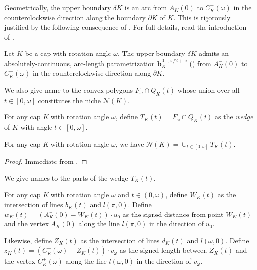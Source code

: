 Geometrically, the upper boundary \(\delta K\) is an arc from \(A_K^-(0)\) to \(C_K^+(\omega)\) in the counterclockwise direction along the boundary \(\partial K\) of \(K\). This is rigorously justified by the following consequence of . For full details, read the introduction of .

\begin{corollary}

Let \(K\) be a cap with rotation angle \(\omega\). The upper boundary \(\delta K\) admits an absolutely-continuous, arc-length parametrization \(\mathbf{b}_K^{0-, \pi/2 + \omega}\) () from \(A_K^-(0)\) to \(C_K^+(\omega)\) in the counterclockwise direction along \(\partial K\).

\label{cor:upper-boundary-param}
\end{corollary}

We also give name to the convex polygons \(F_\omega \cap Q^-_K(t)\) whose union over all \(t \in [0, \omega]\) constitutes the niche \(\mathcal{N}(K)\).

\begin{definition}

For any cap \(K\) with rotation angle \(\omega\), define \(T_K(t) = F_\omega \cap Q^-_K(t)\) as the \emph{wedge} of \(K\) with angle \(t \in [0, \omega]\).

\label{def:wedge}
\end{definition}

\begin{proposition}

For any cap \(K\) with rotation angle \(\omega\), we have \(\mathcal{N}(K) = \cup_{t \in [0, \omega]} T_K(t)\).

\label{pro:wedge}
\end{proposition}

\begin{proof}
Immediate from .
\end{proof}

We give names to the parts of the wedge \(T_K(t)\).

\begin{definition}

For any cap \(K\) with rotation angle \(\omega\) and \(t \in (0, \omega)\), define \(W_K(t)\) as the intersection of lines \(b_K(t)\) and \(l(\pi, 0)\). Define \(w_K(t) = (A_K^-(0) - W_K(t)) \cdot u_0\) as the signed distance from point \(W_K(t)\) and the vertex \(A_K^-(0)\) along the line \(l(\pi, 0)\) in the direction of \(u_0\).

Likewise, define \(Z_K(t)\) as the intersection of lines \(d_K(t)\) and \(l(\omega, 0)\). Define \(z_K(t) = (C_K^+(\omega) - Z_K(t)) \cdot v_\omega\) as the signed length between \(Z_K(t)\) and the vertex \(C_K^+(\omega)\) along the line \(l(\omega, 0)\) in the direction of \(v_\omega\).

\label{def:wedge-side-lengths}
\end{definition}

